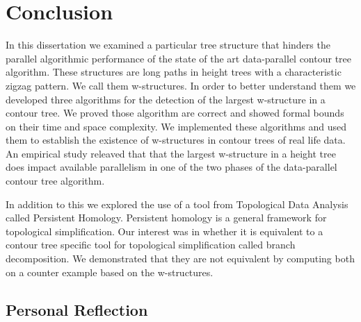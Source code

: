 \chapter{Conclusion}
\label{chapter8}

In this dissertation we examined a particular tree structure that hinders the parallel algorithmic performance of the state of the art data-parallel contour tree algorithm. These structures are long paths in height trees with a characteristic zigzag pattern. We call them w-structures. In order to better understand them we developed three algorithms for the detection of the largest w-structure in a contour tree. We proved those algorithm are correct and showed formal bounds on their time and space complexity. We implemented these algorithms and used them to establish the existence of w-structures in contour trees of real life data.
An empirical study releaved that that the largest w-structure in a height tree does impact available parallelism in one of the two phases of the data-parallel contour tree algorithm.

In addition to this we explored the use of a tool from Topological Data Analysis called Persistent Homology. Persistent homology is a general framework for topological simplification. Our interest was in whether it is equivalent to a contour tree specific tool for topological simplification called branch decomposition. We demonstrated that they are not equivalent by computing both on a counter example based on the w-structures.





\section{Personal Reflection}

